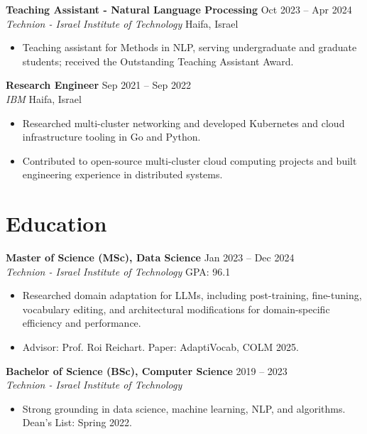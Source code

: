 \documentclass[10pt]{article}
\newcommand{\entry}[4]{%
  \textbf{#1} \hfill #2\\%
  \emph{#3} \hfill #4%
}
\begin{document}
\entry{Teaching Assistant - Natural Language Processing}{Oct 2023 -- Apr 2024}{Technion - Israel Institute of Technology}{Haifa, Israel}
\begin{itemize}
  \item Teaching assistant for Methods in NLP, serving undergraduate and graduate students; received the Outstanding Teaching Assistant Award.
\end{itemize}

\entry{Research Engineer}{Sep 2021 -- Sep 2022}{IBM}{Haifa, Israel}
\begin{itemize}
  \item Researched multi-cluster networking and developed Kubernetes and cloud infrastructure tooling in Go and Python.
  \item Contributed to open-source multi-cluster cloud computing projects and built engineering experience in distributed systems.
\end{itemize}

\section*{Education}
\entry{Master of Science (MSc), Data Science}{Jan 2023 -- Dec 2024}{Technion - Israel Institute of Technology}{GPA: 96.1}
\begin{itemize}
  \item Researched domain adaptation for LLMs, including post-training, fine-tuning, vocabulary editing, and architectural modifications for domain-specific efficiency and performance.
  \item Advisor: Prof. Roi Reichart. Paper: AdaptiVocab, COLM 2025.
\end{itemize}

\entry{Bachelor of Science (BSc), Computer Science}{2019 -- 2023}{Technion - Israel Institute of Technology}{}
\begin{itemize}
  \item Strong grounding in data science, machine learning, NLP, and algorithms. Dean's List: Spring 2022.
\end{itemize}
\end{document}

